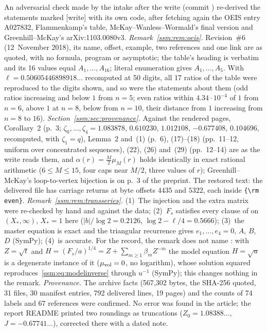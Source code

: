 \begin{writenote}
An adversarial check made by the intake after the write (commit
) re-derived the statements marked [write] with its own
code, after fetching again the OEIS entry A027832, Flammenkamp's table,
McKay--Wanless--Wormald's final version and Greenhill--McKay's
arXiv:1103.0080v3. \emph{Remark~\ref{ssm:rem:oeis}.} Revision~\#6 (12~November
2018), its name, offset, example, two references and one link are as quoted,
with no formula, program or asymptotic; the table's heading is verbatim and
its 16 values equal $A_1,\ldots,A_{16}$; literal enumeration gives
$A_1,\ldots,A_5$. With $\ell=0.50605446898918\ldots$ recomputed at 50 digits,
all 17 ratios of the table were reproduced to the digits shown, and so were
the statements about them (odd ratios increasing and below $1$ from $n=5$;
even ratios within $4.34\cdot10^{-4}$ of $1$ from $n=6$, above $1$ at $n=8$,
below from $n=10$, their distance from $1$ increasing from $n=8$ to $16$).
\emph{Section~\ref{ssm:sec:provenance}.} Against the rendered pages,
Corollary~2 (p.~3; $\zeta_0,\dots,\zeta_4=1.083878$, $0.610230$,
$1.012108$, $-0.677408$, $0.104696$, recomputed, with $\zeta_1=q$), Lemma~2
and~(1) (p.~6), (17)--(18) (pp.~11--12, uniform over concentrated
sequences), (22), (26) and~(29) (pp.~12--14) are as the write reads them,
and $\alpha(r)=\tfrac M2\mu_M(r)$ holds identically in exact rational
arithmetic ($6\le M\le15$, four caps near $M/2$, three values of $r$);
Greenhill--McKay's loop-to-vertex bijection is on p.~3 of the preprint.
The restored text: the delivered file has carriage returns at byte offsets
$4435$ and $5322$, each inside \verb|{\rm even}|. \emph{Remark~\ref{ssm:rem:transseries}.}
(1)~The injection and the extra matrix were re-checked by hand and against the
data; (2)~$F_s$ satisfies every clause of  on
$(X_\ast,\infty)$, $X_\ast=1$ here ($|b|/\log2=0.2126$, $\log2-\ell/4=0.5666$);
(3)~the master equation is exact and the triangular recurrence gives
$e_1,\dots,e_4=0$, $A$, $B$, $D$ (SymPy); (4)~is accurate. For the record,
the remark does not name : with $Z=\sqrt t$ and
$H=(F_s/a)^{1/4}=Z+\sum_{m\ge1}\beta_mZ^{-m}$ the model equation $H=\sqrt u$
is a degenerate instance of it ($\mu_{\rm vol}=0$, no logarithm), whose
solution squared reproduces~\eqref{ssm:eq:modelinverse} through $u^{-1}$
(SymPy); this changes nothing in the remark. \emph{Provenance.} The
archive facts (567{,}302 bytes, the SHA-256 quoted, 31 files, 30 manifest
entries, 792 delivered lines, 19 pages) and the counts of 74 labels and 67
references were confirmed. No error was found in the article; the report
README printed two roundings as truncations ($Z_0=1.08388\ldots$,
$J=-0.67741\ldots$), corrected there with a dated note.
\end{writenote}
